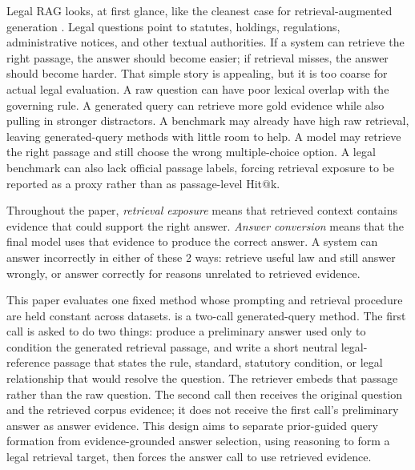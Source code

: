  Legal RAG looks, at first glance, like the cleanest case for retrieval-augmented
generation \citep{lewis2020rag}. Legal questions point to statutes, holdings,
regulations, administrative notices, and other textual authorities. If a system
can retrieve the right passage, the answer should become easier; if retrieval
misses, the answer should become harder. That simple story is appealing, but
it is too coarse for actual legal evaluation. A raw question can have poor
lexical overlap with the governing rule. A generated query can retrieve more
gold evidence while also pulling in stronger distractors. A benchmark may
already have high raw retrieval, leaving generated-query methods with little
room to help. A model may retrieve the right passage and still choose the wrong
multiple-choice option. A legal benchmark can also lack official passage
labels, forcing retrieval exposure to be reported as a proxy rather than as
passage-level Hit@k.

Throughout the paper, \emph{retrieval exposure} means that retrieved context
contains evidence that could support the right answer. \emph{Answer conversion}
means that the final model uses that evidence to produce the correct answer.
A system can answer incorrectly in either of these 2 ways: retrieve useful law and still
answer wrongly, or answer correctly for reasons unrelated to retrieved
evidence.

This paper evaluates one fixed method whose prompting and retrieval procedure
are held constant across datasets. \hyre{} is a two-call generated-query
method. The first call is asked to do two things: produce a
preliminary answer used only to condition the generated retrieval passage, and
write a short neutral legal-reference passage that states the rule, standard,
statutory condition, or legal relationship that would resolve the question. The
retriever embeds that passage rather than the raw question. The second call
then receives the original question and the retrieved corpus evidence; it does
not receive the first call's preliminary answer as answer evidence. This design
aims to separate prior-guided query formation from evidence-grounded answer
selection, using reasoning to form a legal retrieval target, then forces the
answer call to use retrieved evidence.

